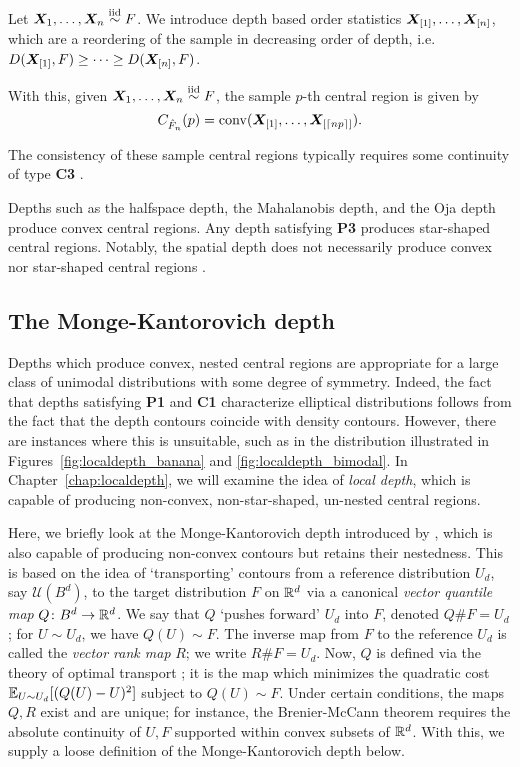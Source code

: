 \begin{definition}
    Let $\bm{X}_1, \dots, \bm{X}_n \overset{\text{iid}}{\sim} F$.
    We introduce depth based order statistics $\bm{X}_{[1]}, \dots, \bm{X}_{[n]}$,
    which are a reordering of the sample in decreasing order of depth, i.e.\
    $D(\bm{X}_{[1]}, F) \geq \dots \geq D(\bm{X}_{[n]}, F)$.
\end{definition}

With this, given $\bm{X}_1, \dots, \bm{X}_n \overset{\text{iid}}{\sim} F$, the sample $p$-th central
region is given by
\begin{equation}
    C_{\hat{F}_n}(p) = \operatorname{conv}(\bm{X}_{[1]}, \dots, \bm{X}_{[\lceil np \rceil]}).
\end{equation}

The consistency of these sample central regions typically requires some
continuity of type \textbf{C3} \parencite{liu-1990, donoho-gasko-1992,
he-wang-1997}.

Depths such as the halfspace depth, the Mahalanobis depth, and the Oja depth
produce convex central regions.
Any depth satisfying \textbf{P3} produces star-shaped central regions.
Notably, the spatial depth does not necessarily produce convex nor star-shaped
central regions \parencite{nagy-2017}.


\subsection{The Monge-Kantorovich depth}

Depths which produce convex, nested central regions are appropriate for a
large class of unimodal distributions with some degree of symmetry.
Indeed, the fact that depths satisfying \textbf{P1} and \textbf{C1}
characterize elliptical distributions follows from the fact that the depth
contours coincide with density contours.
However, there are instances where this is unsuitable, such as in the
distribution illustrated in Figures~\ref{fig:localdepth_banana} and
\ref{fig:localdepth_bimodal}.
In Chapter~\ref{chap:localdepth}, we will examine the idea of \emph{local
depth}, which is capable of producing non-convex, non-star-shaped, un-nested
central regions.

Here, we briefly look at the Monge-Kantorovich depth introduced by
\textcite{chernozhukov-galichon-hallin-henry-2017}, which is also capable of
producing non-convex contours but retains their nestedness.
This is based on the idea of `transporting' contours from a reference
distribution $U_d$, say $\mathcal{U}(B^d)$, to the target distribution $F$ on
$\mathbb{R}^d$ via a canonical \emph{vector quantile map} $Q\colon B^d \to \mathbb{R}^d$.
We say that $Q$ `pushes forward' $U_d$ into $F$, denoted $Q\#F = U_d$; for $U
\sim U_d$, we have $Q(U) \sim F$.
The inverse map from $F$ to the reference $U_d$ is called the \emph{vector
rank map} $R$; we write $R\#F = U_d$.
Now, $Q$ is defined via the theory of optimal transport
\parencite{villani-2003}; it is the map which minimizes the quadratic cost
$\operatorname{\mathbb{E}}_{U \sim U_d}[(Q(U) - U)^2]$ subject to $Q(U) \sim F$.
Under certain conditions, the maps $Q, R$ exist and are unique; for instance,
the Brenier-McCann theorem requires the absolute continuity of $U, F$
supported within convex subsets of $\mathbb{R}^d$.
With this, we supply a loose definition of the Monge-Kantorovich depth below.

